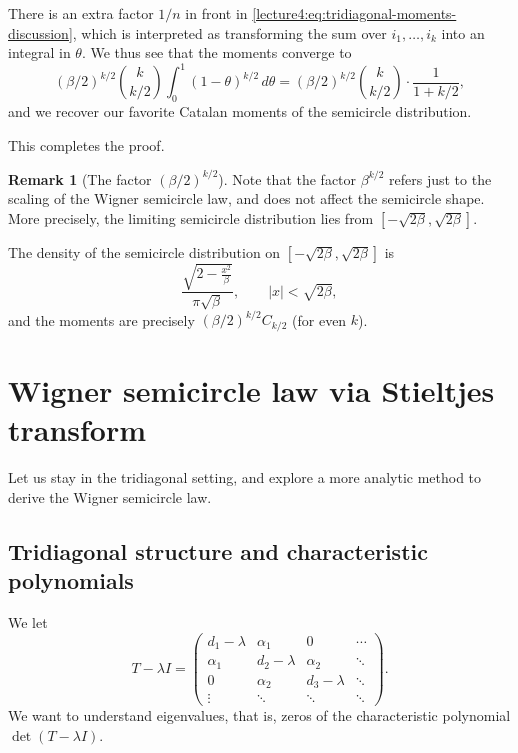 \documentclass[letterpaper,11pt,oneside,reqno]{book}
\numberwithin{equation}{chapter}  %
\theoremstyle{definition}
\newtheorem{remark}[proposition]{Remark}
\begin{document}
There is an extra factor $1/n$ in front in \eqref{lecture4:eq:tridiagonal-moments-discussion},
which is interpreted as transforming the sum over $i_1,\ldots,i_k $
into an integral in $\theta$. We thus see that the moments converge to
\begin{equation*}
	(\beta/2)^{k/2}\binom{k}{k/2}\int_0^1 (1-\theta)^{k/2} \, d\theta=
	(\beta/2)^{k/2}\binom{k}{k/2}\cdot \frac{1}{1+k/2},
\end{equation*}
and we recover our favorite
Catalan moments of the semicircle distribution.

This completes the proof.

\begin{remark}[The factor $(\beta/2)^{k/2}$]
	Note that the factor $\beta^{k/2}$ refers just to the scaling of the Wigner
	semicircle law, and does not affect the semicircle shape. More precisely,
	the limiting semicircle distribution lies from $[-\sqrt{2\beta},\sqrt{2\beta}]$.

	The density of the semicircle distribution on $[-\sqrt{2\beta},\sqrt{2\beta}]$
	is
	\begin{equation*}
		\frac{\sqrt{2-\frac{x^2}{\beta }}}{\pi  \sqrt{\beta }},\qquad |x|<\sqrt{2\beta},
	\end{equation*}
	and the moments are precisely $(\beta/2)^{k/2}C_{k/2}$ (for even $k$).
\end{remark}

\section{Wigner semicircle law via Stieltjes transform}

Let us stay in the tridiagonal setting, and explore a more analytic
method to derive the Wigner semicircle law.

\subsection{Tridiagonal structure and characteristic polynomials}
\label{lecture4:sec:tridiag-charpoly}

We let
\[
  T - \lambda I =
  \begin{pmatrix}
    d_1 - \lambda & \alpha_1 & 0 & \cdots \\
    \alpha_1 & d_2 - \lambda & \alpha_2 & \ddots \\
    0 & \alpha_2 & d_3 - \lambda & \ddots \\
    \vdots & \ddots & \ddots & \ddots
  \end{pmatrix}.
\]
We want to understand
eigenvalues, that is,
zeros of the characteristic polynomial
$\det(T - \lambda I)$.
\end{document}
